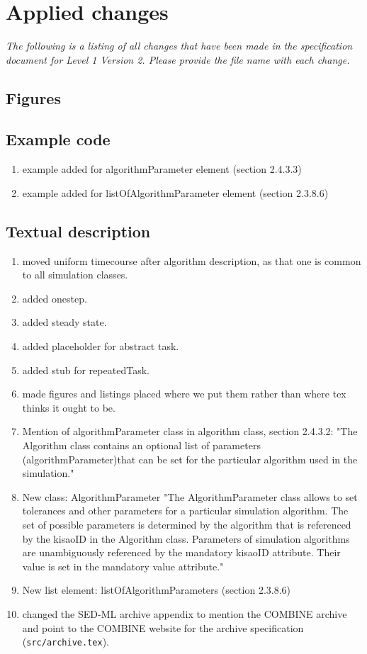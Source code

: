 \documentclass{article}
\newcommand{\code}[1]{\texttt{#1}}
\begin{document}
\section{Applied changes}
\emph{The following is a listing of all changes that have been made in the specification document for Level 1 Version 2. Please provide the file name with each change.}

\subsection{Figures}

\subsection{Example code}
\begin{enumerate}
\item example added for algorithmParameter element (section 2.4.3.3)
\item example added for listOfAlgorithmParameter element (section 2.3.8.6)
\end{enumerate}

\subsection{Textual description}

\begin{enumerate}
\item moved uniform timecourse after algorithm description, as that one is common to all simulation classes. 
\item added onestep. 
\item added steady state. 
\item added placeholder for abstract task.
\item added stub for repeatedTask.
\item made figures and listings placed where we put them rather than where tex thinks it ought to be. 


\item Mention of algorithmParameter class in algorithm class, section 2.4.3.2: "The Algorithm class contains an optional list of parameters (algorithmParameter)that can be set for the particular algorithm used in the simulation."
\item New class: AlgorithmParameter "The AlgorithmParameter class allows to set tolerances and other parameters for a particular simulation
algorithm. The set of possible parameters is determined by the algorithm that is referenced by the
kisaoID in the Algorithm class. Parameters of simulation algorithms are unambiguously referenced by
the mandatory kisaoID attribute. Their value is set in the mandatory value attribute."
\item New list element: listOfAlgorithmParameters (section 2.3.8.6)

\item changed the SED-ML archive appendix to mention the COMBINE archive and
point to the COMBINE website for the archive specification
(\code{src/archive.tex}).
\end{enumerate}
\end{document}
